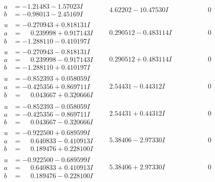 \documentclass[1p]{elsarticle_modified}
\theoremstyle{definition}
\begin{document}
$$\begin{array}{c|c|c}
\begin{aligned}
a &= -1.21483 - 1.57023 I \\
b &= -0.98013 - 2.45169 I\end{aligned}
 & \phantom{-}4.62202 - 10.47530 I & \phantom{-0.000000 } 0 \\ \hline\begin{aligned}
u &= -0.270943 + 0.818131 I \\
a &= \phantom{-}0.239998 + 0.917143 I \\
b &= -1.288110 - 0.410197 I\end{aligned}
 & \phantom{-}0.290512 - 0.483114 I & \phantom{-0.000000 } 0 \\ \hline\begin{aligned}
u &= -0.270943 - 0.818131 I \\
a &= \phantom{-}0.239998 - 0.917143 I \\
b &= -1.288110 + 0.410197 I\end{aligned}
 & \phantom{-}0.290512 + 0.483114 I & \phantom{-0.000000 } 0 \\ \hline\begin{aligned}
u &= -0.852393 + 0.058059 I \\
a &= -0.425356 + 0.869711 I \\
b &= \phantom{-}0.043667 + 0.320666 I\end{aligned}
 & \phantom{-}2.54431 - 0.44312 I & \phantom{-0.000000 } 0 \\ \hline\begin{aligned}
u &= -0.852393 - 0.058059 I \\
a &= -0.425356 - 0.869711 I \\
b &= \phantom{-}0.043667 - 0.320666 I\end{aligned}
 & \phantom{-}2.54431 + 0.44312 I & \phantom{-0.000000 } 0 \\ \hline\begin{aligned}
u &= -0.922500 + 0.689599 I \\
a &= \phantom{-}0.640833 - 0.410913 I \\
b &= \phantom{-}0.189476 + 0.228100 I\end{aligned}
 & \phantom{-}5.38406 - 2.97330 I & \phantom{-0.000000 } 0 \\ \hline\begin{aligned}
u &= -0.922500 - 0.689599 I \\
a &= \phantom{-}0.640833 + 0.410913 I \\
b &= \phantom{-}0.189476 - 0.228100 I\end{aligned}
 & \phantom{-}5.38406 + 2.97330 I & \phantom{-0.000000 } 0 \\ \hline\begin{aligned}

\end{aligned}
\end{array}$$
\end{document}
